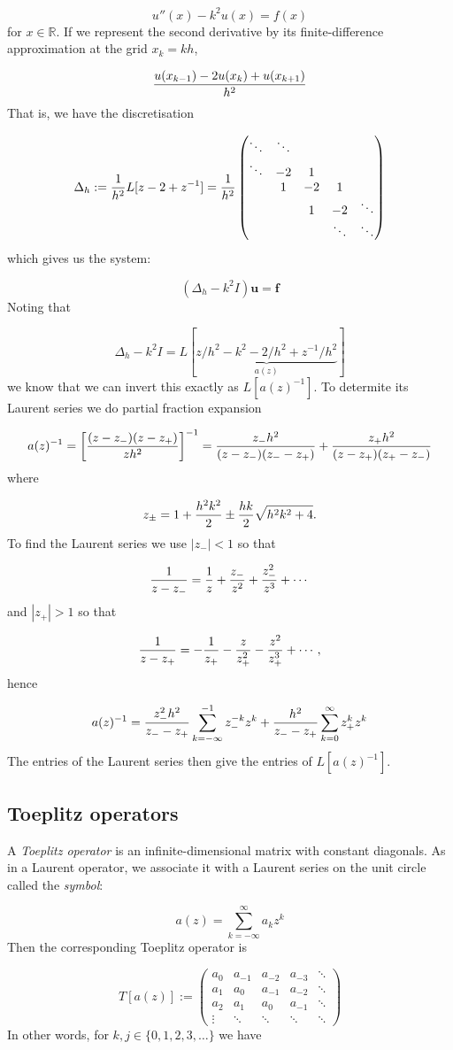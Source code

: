 \documentclass[12pt,a4paper]{article}
\def\R{ {\mathbb R} }
\def\vc#1{ {\mathbf #1} }
\def\br[#1]{\left[{#1}\right]}
\def\sopmatrix#1{ \begin{pmatrix}#1\end{pmatrix} }
\begin{document}
\[
u''(x) - k^2 u(x) = f(x)
\]
for $x \in \R$. If we represent the second derivative by its finite-difference approximation at the grid $x_k = k h$,

\[
{u(x_{k-1}) -2 u(x_k) + u(x_{k+1}) \over h^2}
\]
That is, we have the discretisation

\[
\Delta_h := {1 \over h^2}L[z-2+z^{-1}] = {1 \over h^2} \sopmatrix{\ddots & \ddots \\ 
                \ddots & -2 & 1 \\
                & 1 & -2 & 1 \\
                && 1 & -2 & \ddots \\
                &&&\ddots & \ddots}
\]
which gives us the system:

\[
(\Delta_h - k^2 I) \vc u = \vc f
\]
Noting that

\[
\Delta_h - k^2 I  = L[\underbrace{z/h^2  - k^2 - 2/h^2 + z^{-1}/h^2}_{a(z)}]
\]
we know that we can invert this exactly as $L[a(z)^{-1}]$. To determite its Laurent series  we do partial fraction expansion

\[
a(z)^{-1} = \br[{(z-z_-) (z - z_+) \over  z h^2} ]^{-1} = 
{z_- h^2 \over (z-z_-) (z_--z_+)}  + {z_+ h^2 \over (z-z_+) (z_+-z_-)}
\]
where 

\[
z_\pm = 1 + {h^2k^2 \over 2} \pm {h k \over 2} \sqrt{h^2 k^2+4}.
\]
To find the Laurent series we use $|z_-| < 1$ so that

\[
{1 \over z - z_-} = {1 \over z} + {z_- \over z^2} + {z_-^2 \over z^3} + \cdots
\]
and $|z_+| > 1$ so that

\[
{1 \over z - z_+} = -{1 \over z_+} - {z \over z_+^2} - {z^2 \over z_+^3} + \cdots,
\]
hence

\[
a(z)^{-1} = {z_-^2 h^2 \over z_- - z_+} \sum_{k=-\infty}^{-1} z_-^{-k} z^k + {h^2 \over z_- - z_+} \sum_{k=0}^\infty z_+^k z^k
\]
The entries of the Laurent series then give the entries of $L[a(z)^{-1}]$.

\subsection{Toeplitz operators}
A \emph{Toeplitz operator} is an infinite-dimensional matrix with constant diagonals. As in a Laurent operator, we associate it with a Laurent series on the unit circle called the \emph{symbol}:

\[
a(z) = \sum_{k=-\infty}^\infty a_k z^k
\]
Then the corresponding Toeplitz operator is

\[
T[a(z)] := \sopmatrix{
 a_0 & a_{-1} & a_{-2} & a_{-3} & \ddots \\
 a_1 & a_0 & a_{-1} & a_{-2} & \ddots \\
 a_2 & a_1 & a_0 & a_{-1}   & \ddots \\
\vdots & \ddots& \ddots& \ddots & \ddots
}
\]
In other words, for $k,j \in \{0,1,2,3,\dots \}$ we have
\end{document}
